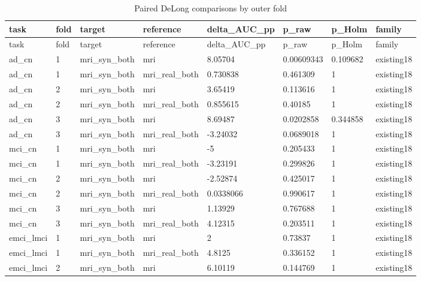 \begin{landscape}
\begingroup
\footnotesize
\setlength{\tabcolsep}{4pt}
\begin{longtable}{llllllll}
\caption{Paired DeLong comparisons by outer fold}\label{tab:classification_delong}\\
\toprule
task & fold & target & reference & delta\_AUC\_pp & p\_raw & p\_Holm & family \\
\midrule
\endfirsthead
\toprule
task & fold & target & reference & delta\_AUC\_pp & p\_raw & p\_Holm & family \\
\midrule
\endhead
\bottomrule
\endfoot
ad\_cn & 1 & mri\_syn\_both & mri & 8.05704 & 0.00609343 & 0.109682 & existing18 \\
ad\_cn & 1 & mri\_syn\_both & mri\_real\_both & 0.730838 & 0.461309 & 1 & existing18 \\
ad\_cn & 2 & mri\_syn\_both & mri & 3.65419 & 0.113616 & 1 & existing18 \\
ad\_cn & 2 & mri\_syn\_both & mri\_real\_both & 0.855615 & 0.40185 & 1 & existing18 \\
ad\_cn & 3 & mri\_syn\_both & mri & 8.69487 & 0.0202858 & 0.344858 & existing18 \\
ad\_cn & 3 & mri\_syn\_both & mri\_real\_both & -3.24032 & 0.0689018 & 1 & existing18 \\
mci\_cn & 1 & mri\_syn\_both & mri & -5 & 0.205433 & 1 & existing18 \\
mci\_cn & 1 & mri\_syn\_both & mri\_real\_both & -3.23191 & 0.299826 & 1 & existing18 \\
mci\_cn & 2 & mri\_syn\_both & mri & -2.52874 & 0.425017 & 1 & existing18 \\
mci\_cn & 2 & mri\_syn\_both & mri\_real\_both & 0.0338066 & 0.990617 & 1 & existing18 \\
mci\_cn & 3 & mri\_syn\_both & mri & 1.13929 & 0.767688 & 1 & existing18 \\
mci\_cn & 3 & mri\_syn\_both & mri\_real\_both & 4.12315 & 0.203511 & 1 & existing18 \\
emci\_lmci & 1 & mri\_syn\_both & mri & 2 & 0.73837 & 1 & existing18 \\
emci\_lmci & 1 & mri\_syn\_both & mri\_real\_both & 4.8125 & 0.336152 & 1 & existing18 \\
emci\_lmci & 2 & mri\_syn\_both & mri & 6.10119 & 0.144769 & 1 & existing18 \\

\end{longtable}
\end{landscape}
